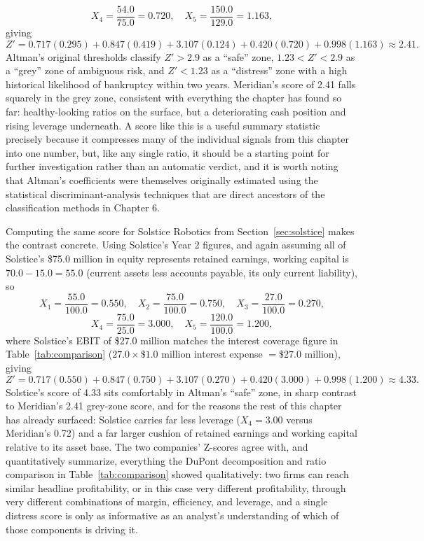 \documentclass[../ai_in_finance]{subfiles}
\begin{document}
\begin{equation*}
X_4 = \frac{54.0}{75.0} = 0.720, \quad X_5 = \frac{150.0}{129.0} = 1.163,
\end{equation*}
giving
\begin{equation*}
Z' = 0.717(0.295) + 0.847(0.419) + 3.107(0.124) + 0.420(0.720) + 0.998(1.163) \approx 2.41.
\end{equation*}
Altman's original thresholds classify $Z' > 2.9$ as a ``safe'' zone, $1.23 < Z' < 2.9$ as a ``grey'' zone of ambiguous risk, and $Z' < 1.23$ as a ``distress'' zone with a high historical likelihood of bankruptcy within two years. Meridian's score of 2.41 falls squarely in the grey zone, consistent with everything the chapter has found so far: healthy-looking ratios on the surface, but a deteriorating cash position and rising leverage underneath. A score like this is a useful summary statistic precisely because it compresses many of the individual signals from this chapter into one number, but, like any single ratio, it should be a starting point for further investigation rather than an automatic verdict, and it is worth noting that Altman's coefficients were themselves originally estimated using the statistical discriminant-analysis techniques that are direct ancestors of the classification methods in Chapter 6.

Computing the same score for Solstice Robotics from Section~\ref{sec:solstice} makes the contrast concrete. Using Solstice's Year 2 figures, and again assuming all of Solstice's \$75.0 million in equity represents retained earnings, working capital is $70.0 - 15.0 = 55.0$ (current assets less accounts payable, its only current liability), so
\begin{equation*}
X_1 = \frac{55.0}{100.0} = 0.550, \quad X_2 = \frac{75.0}{100.0} = 0.750, \quad X_3 = \frac{27.0}{100.0} = 0.270,
\end{equation*}
\begin{equation*}
X_4 = \frac{75.0}{25.0} = 3.000, \quad X_5 = \frac{120.0}{100.0} = 1.200,
\end{equation*}
where Solstice's EBIT of \$27.0 million matches the interest coverage figure in Table~\ref{tab:comparison} ($27.0 \times \$1.0$ million interest expense $= \$27.0$ million), giving
\begin{equation*}
Z' = 0.717(0.550) + 0.847(0.750) + 3.107(0.270) + 0.420(3.000) + 0.998(1.200) \approx 4.33.
\end{equation*}
Solstice's score of 4.33 sits comfortably in Altman's ``safe'' zone, in sharp contrast to Meridian's 2.41 grey-zone score, and for the reasons the rest of this chapter has already surfaced: Solstice carries far less leverage ($X_4 = 3.00$ versus Meridian's 0.72) and a far larger cushion of retained earnings and working capital relative to its asset base. The two companies' Z-scores agree with, and quantitatively summarize, everything the DuPont decomposition and ratio comparison in Table~\ref{tab:comparison} showed qualitatively: two firms can reach similar headline profitability, or in this case very different profitability, through very different combinations of margin, efficiency, and leverage, and a single distress score is only as informative as an analyst's understanding of which of those components is driving it.
\end{document}
